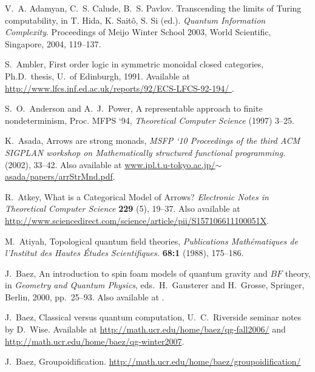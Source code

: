 \documentclass[12pt,twoside,openright]{report}
\begin{document}
\begin{thebibliography}{99}
 V.~A. Adamyan, C.~S. Calude, B.~S. Pavlov. Transcending the limits of Turing computability, in T. Hida, K. Sait\^o, S. Si  (ed.). \emph{Quantum Information Complexity}. Proceedings of Meijo Winter School 2003, World Scientific, Singapore, 2004, 119--137.

 S.\ Ambler, First order logic in symmetric monoidal closed categories, Ph.D.\ thesis, U.\ of Edinburgh, 1991. Available at 
\href{http://www.lfcs.inf.ed.ac.uk/reports/92/ECS-LFCS-92-194/}{http://www.lfcs.inf.ed.ac.uk/reports/92/ECS-LFCS-92-194/ }.

 S.\ O.\ Anderson and A.\ J.\ Power, A representable approach to finite nondeterminism, Proc. MFPS `94, \textsl{Theoretical Computer Science} (1997) 3--25.

 K.\ Asada, Arrows are strong monads, \textsl{MSFP `10 Proceedings of the third ACM SIGPLAN workshop on Mathematically structured functional programming.} (2002), 33--42.  Also available at \href{http://www.ipl.t.u-tokyo.ac.jp/~asada/papers/arrStrMnd.pdf}{www.ipl.t.u-tokyo.ac.jp/$\sim$asada/papers/arrStrMnd.pdf}.

 R.\ Atkey, What is a Categorical Model of Arrows? \emph{Electronic Notes in Theoretical Computer Science} \textbf{229} (5), 19--37.  Also available at\\ \href{http://www.sciencedirect.com/science/article/pii/S157106611100051X}{http://www.sciencedirect.com/science/article/pii/S157106611100051X}.

 M.\ Atiyah, Topological quantum field theories,
\textsl{Publications Math\'ematiques de l'Institut des Hautes \'Etudes Scientifiques.} \textbf{68:1} (1988), 175--186.

 J.\ Baez, An introduction to spin foam models of quantum gravity and $BF$ theory, in {\sl Geometry and Quantum Physics}, eds.\
H.\ Gausterer and H.\ Grosse, Springer, Berlin, 2000, pp.\ 25--93. Also available at .

 J.\ Baez, Classical versus quantum computation, U.\ C.\ Riverside seminar notes by D.\ Wise.  Available at
\href{http://math.ucr.edu/home/baez/qg-fall2006/index.html#computation}{http://math.ucr.edu/home/baez/qg-fall2006/} and\\ \href{http://math.ucr.edu/home/baez/qg-winter2007/index.html#computation}{http://math.ucr.edu/home/baez/qg-winter2007}.

 J.\ Baez, Groupoidification. \href{http://math.ucr.edu/home/baez/groupoidification/}{http://math.ucr.edu/home/baez/groupoidification/}


\end{thebibliography}
\end{document}
